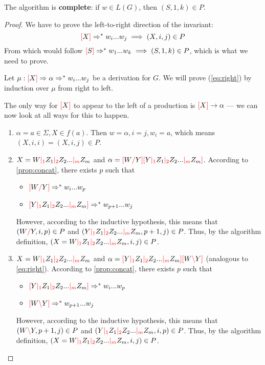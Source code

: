 \documentclass[main.tex]{subfiles}
\begin{document}
\begin{prop}
    The algorithm is \textbf{complete}: if $w \in L(G)$, then $(S, 1, k) \in P$.
\end{prop}
\begin{proof}
    We have to prove the left-to-right direction of the invariant:
    \begin{equation}\label{eq:right}
        \textcolor{red}{[} X \textcolor{red}{]} \Rightarrow^* w_i ... w_j \implies (X, i, j) \in P
    \end{equation}
    From which would follow $ \textcolor{red}{[} S \textcolor{red}{]} \Rightarrow^* w_1 ... w_k \implies (S, 1, k) \in P$,
    which is what we need to prove.

    Let $\mu: \textcolor{red}{[} X \textcolor{red}{]} \Rightarrow \alpha \Rightarrow^* w_i ... w_j$
    be a derivation for $G$. We will prove (\ref{eq:right}) by induction over
    $\mu$ from right to left.

    The only way for $\textcolor{red}{[} X \textcolor{red}{]}$ to appear to the left
    of a production is $\textcolor{red}{[} X \textcolor{red}{]} \rightarrow \alpha$ --- we can now look at
    all ways for this to happen.
    \begin{enumerate}
        \item $\alpha = a \in \Sigma, X \in f(a)$. Then $w = \alpha, i = j, w_i = a$,
            which means $(X, i, i) = (X, i, j) \in P$.
        \item $X = W \textcolor{red}{|_{1}} Z_1 \textcolor{red}{|_{2}} Z_2 ... \textcolor{red}{|_{m}} Z_m$ and
            $\alpha = \textcolor{red}{[} W \textcolor{red}{/} Y \textcolor{red}{]} \textcolor{red}{[} Y \textcolor{red}{|_{1}} Z_1 \textcolor{red}{|_{2}} Z_2 ... \textcolor{red}{|_{m}} Z_m \textcolor{red}{]}$.
            According to \cref{prop:concat}, there exists $p$ such that
            \begin{itemize}
                \item $\textcolor{red}{[} W \textcolor{red}{/} Y \textcolor{red}{]} \Rightarrow^* w_i ... w_p$
                \item $\textcolor{red}{[} Y \textcolor{red}{|_{1}} Z_1 \textcolor{red}{|_{2}} Z_2 ... \textcolor{red}{|_{m}} Z_m \textcolor{red}{]} \Rightarrow^* w_{p+1} ... w_j$
            \end{itemize}
            However, according to the inductive hypothesis, this means that
            $(W \textcolor{red}{/} Y, i, p) \in P$ and
            $(Y \textcolor{red}{|_{1}} Z_1 \textcolor{red}{|_{2}} Z_2 ... \textcolor{red}{|_{m}} Z_m, p + 1, j) \in P$. Thus,
            by the algorithm definition,
            $(X = W \textcolor{red}{|_{1}} Z_1 \textcolor{red}{|_{2}} Z_2 ... \textcolor{red}{|_{m}} Z_m, i, j) \in P$.
        \item $X = W \textcolor{red}{|_{1}} Z_1 \textcolor{red}{|_{2}} Z_2 ... \textcolor{red}{|_{m}} Z_m$ and
            $\alpha = \textcolor{red}{[} Y \textcolor{red}{|_{1}} Z_1 \textcolor{red}{|_{2}} Z_2 ... \textcolor{red}{|_{m}} Z_m \textcolor{red}{]} \textcolor{red}{[} W \textcolor{red}{\backslash} Y \textcolor{red}{]}$
            (analogous to \ref{eq:right}).
            According to \cref{prop:concat}, there exists $p$ such that
            \begin{itemize}
                \item $\textcolor{red}{[} Y \textcolor{red}{|_{1}} Z_1 \textcolor{red}{|_{2}} Z_2 ... \textcolor{red}{|_{m}} Z_m \textcolor{red}{]} \Rightarrow^* w_i ... w_p$
                \item $\textcolor{red}{[} W \textcolor{red}{\backslash} Y \textcolor{red}{]} \Rightarrow^* w_{p + 1} ... w_j$
            \end{itemize}
            However, according to the inductive hypothesis, this means that
            $(W \textcolor{red}{\backslash} Y, p + 1, j) \in P$ and
            $(Y \textcolor{red}{|_{1}} Z_1 \textcolor{red}{|_{2}} Z_2 ... \textcolor{red}{|_{m}} Z_m, i, p) \in P$. Thus,
            by the algorithm definition,
            $(X = W \textcolor{red}{|_{1}} Z_1 \textcolor{red}{|_{2}} Z_2 ... \textcolor{red}{|_{m}} Z_m, i, j) \in P$.
    \end{enumerate}


\end{proof}
\end{document}
